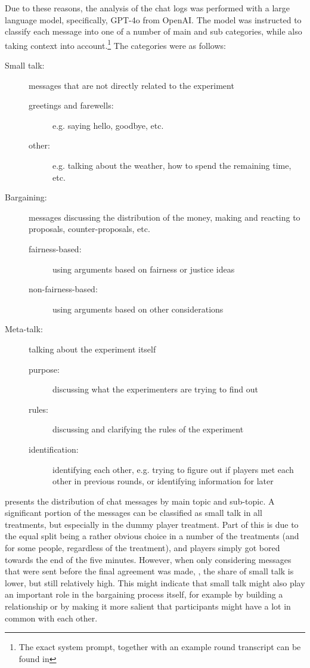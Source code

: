 \documentclass[12pt]{article}
\begin{document}
Due to these reasons, the analysis of the chat logs was performed with a large language model, specifically, GPT-4o from OpenAI. The model was instructed to classify each message into one of a number of main and sub categories, while also taking context into account.\footnote{The exact system prompt, together with an example round transcript can be found in } The categories were as follows:
\begin{description}
    \item[Small talk:] messages that are not directly related to the experiment
    \begin{description}
        \item[greetings and farewells:] e.g. saying hello, goodbye, etc.
        \item[other:] e.g. talking about the weather, how to spend the remaining time, etc.
    \end{description}
    \item[Bargaining:] messages discussing the distribution of the money, making and reacting to proposals, counter-proposals, etc.
    \begin{description}
        \item[fairness-based:] using arguments based on fairness or justice ideas
        \item[non-fairness-based:] using arguments based on other considerations
    \end{description}
    \item[Meta-talk:] talking about the experiment itself
    \begin{description}
        \item[purpose:] discussing what the experimenters are trying to find out
        \item[rules:] discussing and clarifying the rules of the experiment
        \item[identification:] identifying each other, e.g. trying to figure out if players met each other in previous rounds, or identifying information for later
    \end{description}
\end{description}

 presents the distribution of chat messages by main topic and sub-topic. A significant portion of the messages can be classified as small talk in all treatments, but especially in the dummy player treatment. Part of this is due to the equal split being a rather obvious choice in a number of the treatments (and for some people, regardless of the treatment), and players simply got bored towards the end of the five minutes. However, when only considering messages that were sent before the final agreement was made, , the share of small talk is lower, but still relatively high. This might indicate that small talk might also play an important role in the bargaining process itself, for example by building a relationship or by making it more salient that participants might have a lot in common with each other.
\end{document}
